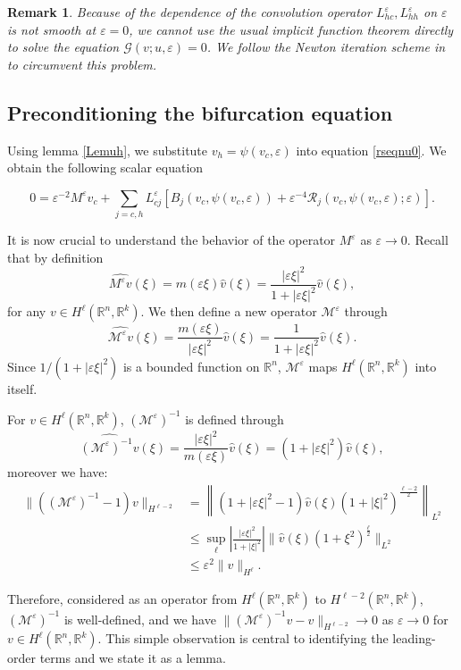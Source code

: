 \documentclass[10pt]{article}
\newtheorem{Remark}[Lemma]{Remark}
\newcommand{\R}{\mathbb{R}}
\newcommand{\eps}{\varepsilon}
\newcommand{\G}{\mathcal{G}}
\newcommand{\M}{\mathcal{M}}
\newcommand{\Rm}{\mathcal{R}}
\begin{document}
\begin{Remark} Because of the dependence of the convolution operator $L_{hc}^\eps, L_{hh}^\eps$ on $\eps$ is not smooth at $\eps = 0$, we cannot use the usual implicit function theorem directly to solve the equation $\G(v;u,\eps) = 0$. We follow the Newton iteration scheme in \cite{faye2015existence} to circumvent this problem.
\end{Remark}
\subsection{Preconditioning the bifurcation equation}
Using lemma \ref{Lemuh}, we substitute $v_h = \psi(v_c,\eps)$ into equation \eqref{rseqnu0}. We obtain the following scalar equation

\begin{equation} \label{1dnl}
0 = \eps^{-2}M^\eps v_c + \sum_{j=c,h}L_{cj}^\eps\left[B_j(v_c,\psi(v_c,\eps))+\eps^{-4}\Rm_j(v_c,\psi(v_c,\eps);\eps)\right].
\end{equation}


It is now crucial to understand the behavior of the operator $M^\eps$ as $\eps \to 0$. Recall that by definition
\[
\widehat{M^\eps v}(\xi) = m(\eps \xi)\widehat{v}(\xi) = \frac{|\eps\xi|^2}{1+|\eps\xi|^2} \widehat{v}(\xi), 
\]
for any $v\in H^\ell(\R^n,\R^k)$. We then define a new operator $\mathcal{M}^\eps$ through 
\[ 
\widehat{\mathcal{M}^\eps v}(\xi) = \frac{m(\eps\xi)}{|\eps\xi|^2}\widehat{v}(\xi)=\frac{1}{1+|\eps\xi|^2} \widehat{v}(\xi). 
\] 
Since $1/(1+|\eps \xi|^2)$ is a bounded function on $\R^n$, $\M^\eps$ maps $H^\ell(\R^n,\R^k)$ into itself. 

For $v\in H^\ell(\R^n,\R^k)$, $(\M^{\eps})^{-1}$ is defined through
\[
\widehat{(\M^{\eps})^{-1}v} (\xi) = \frac{|\eps\xi|^2}{m(\eps\xi)} \widehat{v}(\xi)= (1+|\eps \xi|^2)\widehat{v}(\xi),
\]
moreover we have:
\begin{align*}
\|((\M^\eps)^{-1}-1)v\|_{H^{\ell-2}} &=\left\| \left(1+|\eps\xi|^2-1\right)\widehat{v}(\xi)(1+|\xi|^2)^{\frac{\ell-2}{2}}\right\|_{L^2} 
\\
& \le \sup_{\ell} \left|\frac{|\eps\xi|^2}{1+|\xi|^2}\right| \|\widehat{v}(\xi)(1+\xi^2)^{\frac{\ell}{2}} \|_{L^{2}}\\ 
&\le \eps^2 \|v\|_{H^\ell}.
\end{align*}

Therefore, considered as an operator from $H^\ell (\R^n,\R^k)$ to $H^{\ell-2}(\R^n,\R^k)$, $(\M^\eps)^{-1}$ is well-defined, and we have $\|(\M^{\eps})^{-1}v - v\|_{H^{\ell-2}} \to 0$ as $\eps \to 0$ for $v \in H^\ell (\R^n,\R^k)$. This simple observation is central to identifying the leading-order terms and  we state it as a lemma.
\end{document}
